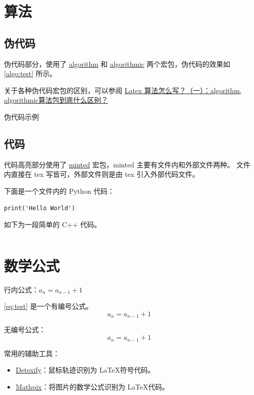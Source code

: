 \section{算法}

\subsection{伪代码}

伪代码部分，使用了 \href{https://ctan.org/pkg/algorithms/}{algorithm} 和 \href{https://www.ctan.org/pkg/context-algorithmic}{algorithmic} 两个宏包，伪代码的效果如 \autoref{algo:test} 所示。

关于各种伪代码宏包的区别，可以参阅 \href{https://zhuanlan.zhihu.com/p/145195565}{Latex 算法怎么写？（一）：algorithm, algorithmic算法包到底什么区别？}

\begin{algorithm}[H]
    \centering
    \caption{伪代码示例}
    \label{algo:test}
    
\end{algorithm}

\subsection{代码}

代码高亮部分使用了 \href{https://www.ctan.org/pkg/minted}{minted} 宏包，minted 主要有文件内和外部文件两种。
文件内直接在 tex 写皆可，外部文件则是由 tex 引入外部代码文件。

下面是一个文件内的 Python 代码：
\begin{verbatim}
print('Hello World')
\end{verbatim}

如下为一段简单的 C++ 代码。
\inputminted{c++}{code/test.cpp}

\section{数学公式}

行内公式：$a_n = a_{n-1} + 1$

\autoref{eq:test} 是一个有编号公式。
\begin{equation}
    \label{eq:test}
    a_n = a_{n-1} + 1
\end{equation}

无编号公式：
$$
    a_n = a_{n-1} + 1
$$

常用的辅助工具：

\begin{itemize}
    \item \href{http://detexify.kirelabs.org/classify.html}{Detexify}：鼠标轨迹识别为 \LaTeX 符号代码。
    \item \href{https://mathpix.com/}{Mathpix}：将图片的数学公式识别为 \LaTeX 代码。
\end{itemize}

